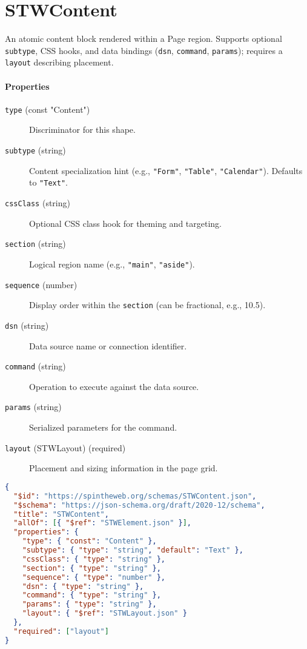 \section{STWContent}
An atomic content block rendered within a Page region. Supports optional \texttt{subtype}, CSS hooks, and data bindings (\texttt{dsn}, \texttt{command}, \texttt{params}); requires a \texttt{layout} describing placement.
\paragraph{Properties}
\begin{description}
  \item[\texttt{type} (const "Content")] Discriminator for this shape.
  \item[\texttt{subtype} (string)] Content specialization hint (e.g., \texttt{"Form"}, \texttt{"Table"}, \texttt{"Calendar"}). Defaults to \texttt{"Text"}.
  \item[\texttt{cssClass} (string)] Optional CSS class hook for theming and targeting.
  \item[\texttt{section} (string)] Logical region name (e.g., \texttt{"main"}, \texttt{"aside"}).
  \item[\texttt{sequence} (number)] Display order within the \texttt{section} (can be fractional, e.g., 10.5).
  \item[\texttt{dsn} (string)] Data source name or connection identifier.
  \item[\texttt{command} (string)] Operation to execute against the data source.
  \item[\texttt{params} (string)] Serialized parameters for the command.
  \item[\texttt{layout} (STWLayout) (required)] Placement and sizing information in the page grid.
\end{description}
\begin{lstlisting}[language=JSON,caption={STWContent Schema Definition}]
{
  "$id": "https://spintheweb.org/schemas/STWContent.json",
  "$schema": "https://json-schema.org/draft/2020-12/schema",
  "title": "STWContent",
  "allOf": [{ "$ref": "STWElement.json" }],
  "properties": {
    "type": { "const": "Content" },
    "subtype": { "type": "string", "default": "Text" },
    "cssClass": { "type": "string" },
    "section": { "type": "string" },
    "sequence": { "type": "number" },
    "dsn": { "type": "string" },
    "command": { "type": "string" },
    "params": { "type": "string" },
    "layout": { "$ref": "STWLayout.json" }
  },
  "required": ["layout"]
}
\end{lstlisting}

